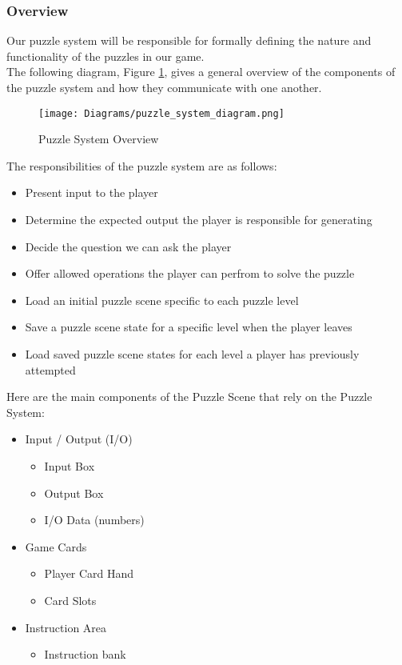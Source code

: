 \subsubsection{Overview}
Our puzzle system will be responsible for formally defining the nature and
functionality of the puzzles in our game.\\

The following diagram, Figure \ref{fig:puzzle_system_diagram}, gives a general overview of the components
of the puzzle system and how they communicate with one another.

\begin{figure}[!hb]
  \caption{Puzzle System Overview}
  \label{fig:puzzle_system_diagram}
  \centering
  \texttt{[image: Diagrams/puzzle\_system\_diagram.png]}
\end{figure}
\vfill
\clearpage

The responsibilities of the puzzle system are as follows:

\begin{itemize}
	\item Present input to the player
	\item Determine the expected output the player is responsible for generating
	\item Decide the question we can ask the player
	\item Offer allowed operations the player can perfrom to solve the puzzle
	\item Load an initial puzzle scene specific to each puzzle level
	\item Save a puzzle scene state for a specific level when the player leaves
	\item Load saved puzzle scene states for each level a player has previously attempted
\end{itemize}

Here are the main components of the Puzzle Scene that rely on the Puzzle System:

\begin{itemize}
	\item Input / Output (I/O)
	\begin{itemize}
		\item Input Box
		\item Output Box
		\item I/O Data (numbers)
	\end{itemize}

	\item Game Cards
	\begin{itemize}
		\item Player Card Hand
		\item Card Slots
	\end{itemize}

	\item Instruction Area
	\begin{itemize}
		\item Instruction bank
	\end{itemize}
\end{itemize}

